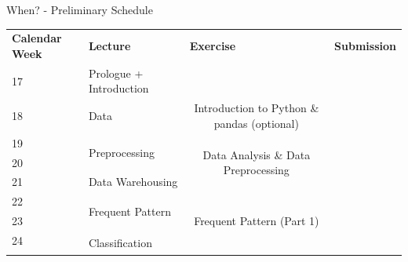 \begin{frame}{When? - Preliminary Schedule}
	\footnotesize
	\centering
	\begin{tabular}{|p{4em}|p{15em}|p{9.5em}|p{9.5em}|p{10em}|}
		\hline
		\rowcolor{faugray!62}\textbf{Calendar Week} & \textbf{Lecture}                  & \multicolumn{2}{|l|}{\textbf{Exercise}}                                         & \textbf{Submission}                                \\ \hhline{*{5}{:=}:}
		\cellcolor{faugray!25}17                    & Prologue + Introduction           & \multicolumn{2}{|l|}{\cellcolor{gray!50}}                                       & \cellcolor{gray!50}                                \\ \hhline{|-|-|--|-|}
		\cellcolor{faugray!25}18                    & Data                              & \multicolumn{2}{|c|}{Introduction to Python \& pandas {\color{gray}(optional)}} & \cellcolor{gray!50}                                \\ \hhline{|-|-|--|-|}
		\cellcolor{faugray!25}19                    & \multirow{2}{*}{Preprocessing}    & \multicolumn{2}{|c|}{\multirow{3}{*}{Data Analysis \& Data Preprocessing}}      & \cellcolor{gray!50}                                \\ \hhline{|-|~|~~|-|}
		\cellcolor{faugray!25}20                    &                                   & \multicolumn{2}{|l|}{}                                                          & \cellcolor{gray!50}                                \\ \hhline{|-|-|~~|-|}
		\cellcolor{faugray!25}21                    & Data Warehousing                  & \multicolumn{2}{|l|}{}                                                          & \cellcolor{gray!50}                                \\ \hhline{|-|-|--|-|}
		\cellcolor{faugray!25}22                    & \multirow{2}{*}{Frequent Pattern} & \multicolumn{2}{|c|}{\cellcolor{gray!50}}                                       & \cellcolor{gray!50}                                \\ \hhline{|-|~|--|-|}
		\cellcolor{faugray!25}23                    &                                   & \multicolumn{2}{|c|}{Frequent Pattern {\color{gray}(Part 1)}}                   & \cellcolor{gray!50}                                \\ \hhline{|-|-|--|-|}
		\cellcolor{faugray!25}24                    & \multirow{2}{*}{Classification}   & \multicolumn{2}{|l|}{\cellcolor{gray!50}}                                       & \cellcolor{gray!50}                                \\ \hhline{|-|~|--|-|}

\end{tabular}
\end{frame}
